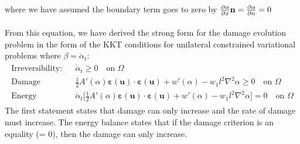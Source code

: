 \documentclass[12pt,3p]{article}
\numberwithin{equation}{section}
\begin{document}
where we have assumed the boundary term goes to zero by \textcolor{red}{$\pdv{\alpha}{x} \mathbf{n} = \pdv{\alpha}{n} = 0$} \\ \\ 
From this equation, we have derived the strong form for the damage evolution problem in the form of the KKT conditions for unilateral constrained variational problems where $\beta = \dot{\alpha}_t$: 
\begin{align}\label{kktCond}
\begin{split}
\text{Irreversibility: }&
\dot{\alpha}_t \geq 0 \quad \text{on } \Omega \\
\text{Damage criterion: }&
\frac{1}{2} A'(\alpha) \boldsymbol{\varepsilon} (\mathbf{u}) \cdot \boldsymbol{\varepsilon} (\mathbf{u}) + w'(\alpha) - w_1 l^2 \nabla^2 \alpha \geq 0 \quad \text{on } \Omega \\
\text{Energy Balance: }&
\dot{\alpha}_t \bigg[ \frac{1}{2} A'(\alpha) \boldsymbol{\varepsilon} (\mathbf{u}) \cdot \boldsymbol{\varepsilon} (\mathbf{u}) + w'(\alpha) - w_1 l^2 \nabla^2 \alpha \bigg] = 0  \quad \text{on } \Omega
\end{split}
\end{align}
The first statement states that damage can only increase and the rate of damage must increase. The energy balance states that if the damage criterion is an equality (= 0), then the damage can only increase.  

\end{document}
